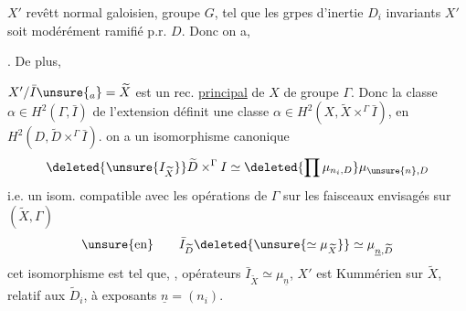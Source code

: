 $X'$ revêtt  normal galoisien, groupe $G$, tel que les grpes d'inertie  $D_i$  invariants  $X'$ soit modérément ramifié p.r.  $D$. Donc on a, 

. De plus,

$X'/\bar I\unsure{{}_a}=\widetilde X$ est  un rec. \uline{principal} de $X$ de groupe $\Gamma$. Donc la classe $\alpha\in H^2(\Gamma,\bar I)$ de l'extension définit une classe  $\alpha\in H^2(X,\widetilde X\mathbin{\times}^{\Gamma}\bar I)$,  en $H^2(D,\widetilde D\mathbin{\times}^{\Gamma}\bar I)$.  on a un isomorphisme canonique
\[
\deleted{\unsure{I_{\widetilde X}}}\widetilde D\mathbin{\times}^{\Gamma}I
\simeq\deleted{\prod\mu_{n_i,D}}\mu_{\unsure{n},D}
\]
i.e. un isom. compatible avec les opérations de $\Gamma$  sur les faisceaux envisagés sur $(\widetilde X,\Gamma)$
\[
\unsure{\text{en}}\qquad \bar I_{\widetilde D}\deleted{\unsure{\simeq\mu_{\widetilde X}}}\simeq\mu_{\underline n,\widetilde D}
\]
 cet isomorphisme est tel que,  , opérateurs $\bar I_{\widetilde X}\simeq\mu_{\underline n}$, $X'$ est  Kummérien sur $\widetilde X$, relatif aux $\widetilde D_i$, à exposants $\underline n=(n_i)$.

